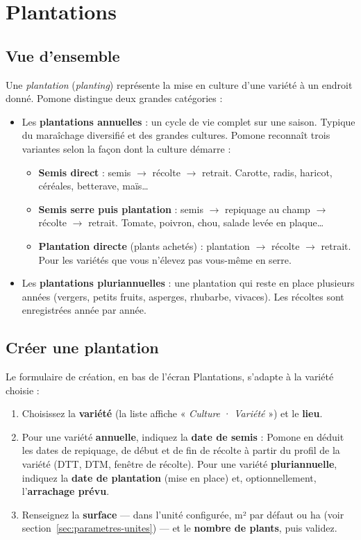 \chapter{Plantations}
\label{chap:plantations}

\section{Vue d'ensemble}

Une \emph{plantation} (\emph{planting}) représente la mise en culture d'une variété à un endroit donné. Pomone distingue deux grandes catégories :

\begin{itemize}
  \item Les \textbf{plantations annuelles} : un cycle de vie complet sur une saison. Typique du maraîchage diversifié et des grandes cultures. Pomone reconnaît trois variantes selon la façon dont la culture démarre :
    \begin{itemize}
      \item \textbf{Semis direct} : semis $\to$ récolte $\to$ retrait. Carotte, radis, haricot, céréales, betterave, maïs\ldots
      \item \textbf{Semis serre puis plantation} : semis $\to$ repiquage au champ $\to$ récolte $\to$ retrait. Tomate, poivron, chou, salade levée en plaque\ldots
      \item \textbf{Plantation directe} (plants achetés) : plantation $\to$ récolte $\to$ retrait. Pour les variétés que vous n'élevez pas vous-même en serre.
    \end{itemize}
  \item Les \textbf{plantations pluriannuelles} : une plantation qui reste en place plusieurs années (vergers, petits fruits, asperges, rhubarbe, vivaces). Les récoltes sont enregistrées année par année.
\end{itemize}

\section{Créer une plantation}

Le formulaire de création, en bas de l'écran Plantations, s'adapte à la variété choisie :

\begin{enumerate}
  \item Choisissez la \textbf{variété} (la liste affiche « \emph{Culture} · \emph{Variété} ») et le \textbf{lieu}.
  \item Pour une variété \textbf{annuelle}, indiquez la \textbf{date de semis} : Pomone en déduit les dates de repiquage, de début et de fin de récolte à partir du profil de la variété (DTT, DTM, fenêtre de récolte). Pour une variété \textbf{pluriannuelle}, indiquez la \textbf{date de plantation} (mise en place) et, optionnellement, l'\textbf{arrachage prévu}.
  \item Renseignez la \textbf{surface} — dans l'unité configurée, m² par défaut ou ha (voir section~\ref{sec:parametres-unites}) — et le \textbf{nombre de plants}, puis validez.
\end{enumerate}

